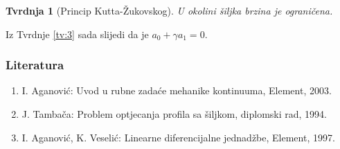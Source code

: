 \documentclass[a4paper,oneside,12pt]{memoir} %
\newtheorem{tvrdnja}[teorem]{Tvrdnja}
\begin{document}
\begin{tvrdnja}[Princip Kutta-Žukovskog] \label{tv:13}
U okolini šiljka brzina je ograničena.
\end{tvrdnja}

Iz Tvrdnje \ref{tv:3} sada slijedi da je $a_0 + \gamma a_1 = 0$.

\pagebreak

\subsubsection*{Literatura}
\begin{enumerate}
\item I. Aganović: Uvod u rubne zadaće mehanike kontinuuma, Element, 2003.
\item J. Tambača: Problem optjecanja profila sa šiljkom, diplomski rad, 1994.
\item I. Aganović, K. Veselić: Linearne diferencijalne jednadžbe, Element, 1997.
\end{enumerate}
\end{document}
